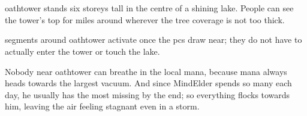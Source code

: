 \section{}
\label{oathtower}

\Gls{oathtower} stands six storeys tall in the centre of a shining lake.
People can see the tower's top for miles around wherever the tree coverage is not too thick.

\Glspl{segment} around \gls{oathtower} activate once the \glspl{pc} draw near; they do not have to actually enter the tower or touch the lake.

Nobody near \gls{oathtower} can breathe in the local mana, because mana always heads towards the largest vacuum.
And since \gls{MindElder} spends so many  each day, he usually has the most missing by the end; so everything flocks towards him, leaving the air feeling stagnant even in a storm.


